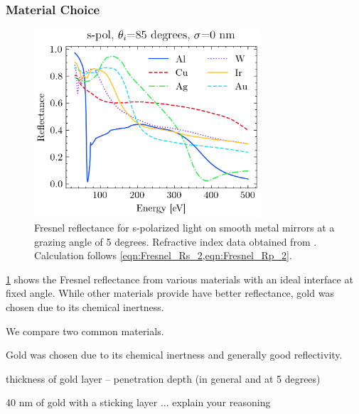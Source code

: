 \subsubsection{Material Choice}
\begin{figure}
	\centering
	\includegraphics[width=0.75\textwidth]{figures/chap2/Fresnel_NoSigma.png}
	\caption{Fresnel reflectance for s-polarized light on smooth metal mirrors at a grazing angle of 5 degrees. Refractive index data obtained from \cite{gulliksonCXROXRayInteractions,henkeXRayInteractionsPhotoabsorption1993}. Calculation follows \cref{eqn:Fresnel_Rs_2,eqn:Fresnel_Rp_2}.}
	\label{fig:Mirror_Material_Choice}
\end{figure}

\cref{fig:Mirror_Material_Choice} shows the Fresnel reflectance from various materials with an ideal interface at fixed angle. While other materials provide have better reflectance, gold was chosen due to its chemical inertness. 

We compare two common materials.

Gold was chosen due to its chemical inertness and generally good reflectivity.

thickness of gold layer -- penetration depth (in general and at 5 degrees)

40 nm of gold with a sticking layer ... explain your reasoning

